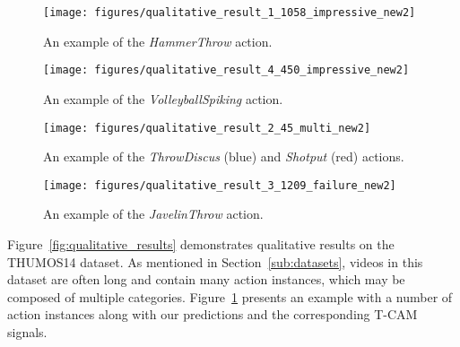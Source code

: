 \documentclass[10pt,twocolumn,letterpaper]{article}
\begin{document}
\begin{figure*}[t]
\captionsetup{font=small}
\centering
	\begin{subfigure}[b]{\textwidth}
\texttt{[image: figures/qualitative\_result\_1\_1058\_impressive\_new2]}
		\caption{An example of the {\it HammerThrow} action.}
\label{fig:qualitative_impressive}
    \end{subfigure}
\begin{subfigure}[b]{\textwidth}
\texttt{[image: figures/qualitative\_result\_4\_450\_impressive\_new2]}
       	\caption{An example of the {\it VolleyballSpiking} action.}
\label{fig:qualitative_impressive_2}
        \end{subfigure}
\begin{subfigure}[b]{\textwidth}
\texttt{[image: figures/qualitative\_result\_2\_45\_multi\_new2]}
    	\caption{An example of the {\it ThrowDiscus} (blue) and {\it Shotput} (red) actions.}
\label{fig:qualitative_multi}
    \end{subfigure}
\begin{subfigure}[b]{\textwidth}
\texttt{[image: figures/qualitative\_result\_3\_1209\_failure\_new2]}
        \caption{An example of the {\it JavelinThrow} action.}
        \label{fig:qualitative_failure}
    \end{subfigure}
    \caption{Qualitative results on THUMOS14. The horizontal axis in the plots denote the timestamps (in seconds). (a) There are many action instances in the input videos and our algorithm shows good action localization performance. (b) The appearance of the video remains similar from the beginning to the end. There is little motion between frames. Our model is still able to localize the time window where the action actually happens. (c) Two different actions appear in a single video and their appearance and the motion patterns are similar. Even in the case, the proposed algorithm successfully identifies two actions accurately despite some false positives.  (d) Our results have several false positives, but they are often from missing ground-truth annotations. Another source of false alarms is the similarity of the observed actions to the target action.}
\label{fig:qualitative_results}
\end{figure*}
Figure~\ref{fig:qualitative_results} demonstrates qualitative results on the THUMOS14 dataset.
As mentioned in Section~\ref{sub:datasets}, videos in this dataset are often long and contain many action instances, which may be composed of multiple categories.
Figure~\ref{fig:qualitative_impressive} presents an example with a number of action instances along with our predictions and the corresponding T-CAM signals.
\end{document}

